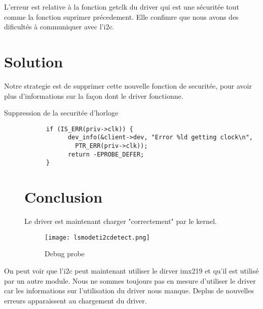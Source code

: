 L'erreur est relative à la fonction getclk du driver qui est une sécuritée tout comme la fonction suprimer précedement.
Elle confimre que nous avons des dificultés à communiquer avec l'i2c.

\section{Solution}
Notre strategie est de supprimer cette nouvelle fonction de securitée, pour avoir plus
d'informations sur la façon dont le driver fonctionne.
\begin{description}
  \item[Suppression de la securitée d'horloge]
    \begin{lstlisting}
	  if (IS_ERR(priv->clk)) {
		    dev_info(&client->dev, "Error %ld getting clock\n",
			  PTR_ERR(priv->clk));
		    return -EPROBE_DEFER;
	  }
    \end{lstlisting}
\section{Conclusion}
Le driver est maintenant charger "correctement" par le kernel.

\begin{figure}[th]
  \centering
  \texttt{[image: lsmodeti2cdetect.png]}
  \decoRule
  \caption{Debug probe}  \label{fig:planning}
\end{figure}

    \clearpage
  \end{description}

  On peut voir que l'i2c peut maintenant utiliser le dirver imx219 et 
  qu'il est utilisé par un autre module. Nous ne sommes toujours pas en mesure
  d'utiliser le driver car les informations sur l'utilisation du driver nous manque.
  Deplus de nouvelles erreurs apparaissent au chargement du driver.


